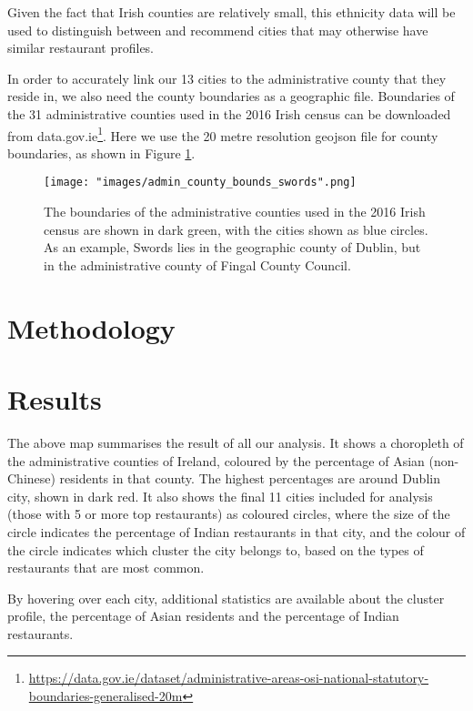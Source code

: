 \documentclass[a4paper,11pt]{article}
\begin{document}
Given the fact that Irish counties are relatively small, this ethnicity data will be used to distinguish between and recommend cities that may otherwise have similar restaurant profiles. 

In order to accurately link our 13 cities to the administrative county that they reside in, we also need the county boundaries as a geographic file. Boundaries of the 31 administrative counties used in the 2016 Irish census can be downloaded from data.gov.ie\footnote{\url{https://data.gov.ie/dataset/administrative-areas-osi-national-statutory-boundaries-generalised-20m}}. Here we use the 20 metre resolution geojson file for county boundaries, as shown in Figure \ref{fig:admin counties}.
%
\begin{figure}[htb]
   \centering
   \texttt{[image: "images/admin\_county\_bounds\_swords".png]}
      \caption{The boundaries of the administrative counties used in the 2016 Irish census are shown in dark green, with the cities shown as blue circles. As an example, Swords lies in the geographic county of Dublin, but in the administrative county of Fingal County Council.}
      \label{fig:admin counties}
\end{figure}
%   



\section{Methodology}


\section{Results}

The above map summarises the result of all our analysis. 
It shows a choropleth of the administrative counties of Ireland, coloured by the percentage of Asian (non-Chinese) residents in that county. The highest percentages are around Dublin city, shown in dark red.
It also shows the final 11 cities included for analysis (those with 5 or more top restaurants) as coloured circles, where the size of the circle indicates the percentage of Indian restaurants in that city, and the colour of the circle indicates which cluster the city belongs to, based on the types of restaurants that are most common.

By hovering over each city, additional statistics are available about the cluster profile, the percentage of Asian residents and the percentage of Indian restaurants.
\end{document}
